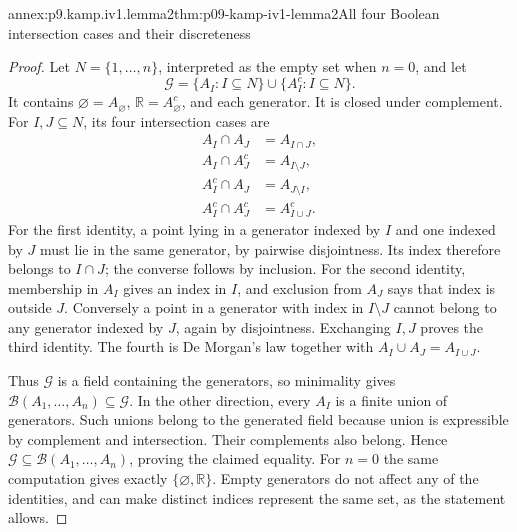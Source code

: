 \begin{annexitem}{annex:p9.kamp.iv1.lemma2}{thm:p09-kamp-iv1-lemma2}{All four Boolean intersection cases and their discreteness}
\begin{proof}
Let \(N=\{1,\ldots,n\}\), interpreted as the empty set
when \(n=0\), and let
\[
             \mathcal G=\{A_I:I\subseteq N\}
                          \cup\{A_I^c:I\subseteq N\}.
\]
It contains \(\varnothing=A_{\varnothing}\),
\(\mathbb R=A_{\varnothing}^c\), and each generator.
It is closed under complement. For \(I,J\subseteq N\),
its four intersection cases are
\[
\begin{aligned}
 A_I\cap A_J&=A_{I\cap J},\\
 A_I\cap A_J^c&=A_{I\setminus J},\\
 A_I^c\cap A_J&=A_{J\setminus I},\\
 A_I^c\cap A_J^c&=A_{I\cup J}^c.
\end{aligned}
 \tag{3}
\]
For the first identity, a point lying in a generator indexed by
\(I\) and one indexed by \(J\) must lie in the same generator,
by pairwise disjointness. Its index therefore belongs to
\(I\cap J\); the converse follows by inclusion. For the
second identity, membership in \(A_I\) gives an index in
\(I\), and exclusion from \(A_J\) says that index is outside
\(J\). Conversely a point in a generator with index in
\(I\setminus J\) cannot belong to any generator indexed by
\(J\), again by disjointness. Exchanging \(I,J\) proves
the third identity. The fourth is De Morgan's law together with
\(A_I\cup A_J=A_{I\cup J}\).

Thus \(\mathcal G\) is a field containing the generators, so
minimality gives
\(\mathcal B(A_1,\ldots,A_n)\subseteq\mathcal G\).
In the other direction, every \(A_I\) is a finite union of
generators. Such unions belong to the generated field because
union is expressible by complement and intersection. Their
complements also belong. Hence \(\mathcal G\subseteq
\mathcal B(A_1,\ldots,A_n)\), proving the claimed equality.
For \(n=0\) the same computation gives exactly
\(\{\varnothing,\mathbb R\}\). Empty generators do not
affect any of the identities, and can make distinct indices
represent the same set, as the statement allows.


\end{proof}
\end{annexitem}

